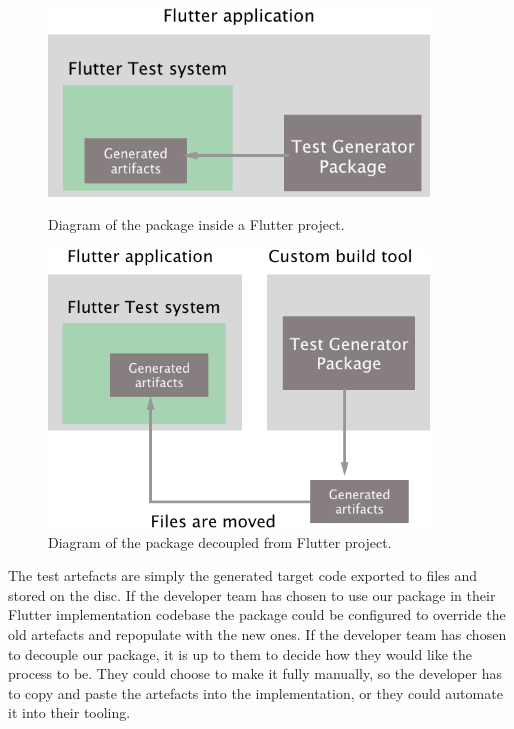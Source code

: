 \begin{figure}[H]
    \centering
    \begin{minipage}{0.45\textwidth}
        \centering
        \includegraphics[width=0.9\textwidth]{images/Embedded-in-flutter.png}
        \caption{Diagram of the package inside a Flutter project.}
        \label{package_in_futter}
    \end{minipage}\hfill
    \begin{minipage}{0.45\textwidth}
        \centering
        \includegraphics[width=0.9\textwidth]{images/Decoupled-from-flutter.png}
        \caption{Diagram of the package decoupled from Flutter project.}
        \label{package_outside_flutter}
    \end{minipage}
\end{figure}

The test artefacts are simply the generated target code exported to files and stored on the disc. 
If the developer team has chosen to use our package in their Flutter implementation codebase the package could be configured to override the old artefacts and repopulate with the new ones.
If the developer team has chosen to decouple our package, it is up to them to decide how they would like the process to be.
They could choose to make it fully manually, so the developer has to copy and paste the artefacts into the implementation, or they could automate it into their tooling.

